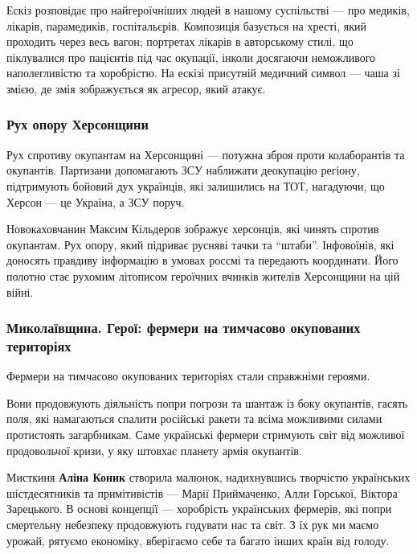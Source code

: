 
Ескіз розповідає про найгероїчніших людей в нашому суспільстві — про медиків,
лікарів, парамедиків, госпітальєрів. Композиція базується на хресті, який
проходить через весь вагон; портретах лікарів в авторському стилі, що
піклувалися про пацієнтів під час окупації, інколи досягаючи неможливого
наполегливістю та хоробрістю. На ескізі присутній медичний символ — чаша зі
змією, де змія зображується як агресор, який атакує. 

\subsubsection{Рух опору Херсонщини}

Рух спротиву окупантам на Херсонщині — потужна зброя проти колаборантів та
окупантів. Партизани допомагають ЗСУ наближати деокупацію регіону, підтримують
бойовий дух українців, які залишились на ТОТ, нагадуючи, що Херсон — це
Україна, а ЗСУ поруч.


Новокаховчанин Максим Кільдеров зображує херсонців, які чинять спротив
окупантам. Рух опору, який підриває русняві тачки та \enquote{штаби}. Інфовоїнів, які
доносять правдиву інформацію в умовах россмі та передають координати. Його
полотно стає рухомим літописом героїчних вчинків жителів Херсонщини на цій
війні. 

\subsubsection{Миколаївщина. Герої: фермери на тимчасово окупованих територіях}

Фермери на тимчасово окупованих територіях стали справжніми героями.

Вони продовжують діяльність попри погрози та шантаж із боку окупантів, гасять
поля, які намагаються спалити російські ракети та всіма можливими силами
протистоять загарбникам. Саме українські фермери стримують світ від можливої
продовольчої кризи, у яку штовхає планету армія окупантів.


Мисткиня \textbf{Аліна Коник} створила малюнок, надихнувшись творчістю українських
шістдесятників та примітивістів — Марії Приймаченко, Алли Горської, Віктора
Зарецького. В основі концепції — хоробрість українських фермерів, які попри
смертельну небезпеку продовжують годувати нас та світ. З їх рук ми маємо
урожай, рятуємо економіку, вберігаємо себе та багато інших країн від голоду.

